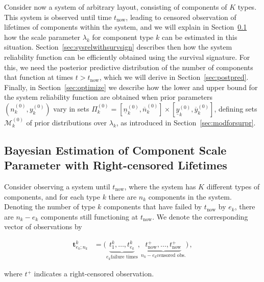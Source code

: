 \documentclass[Journal,letterpaper]{ascelike-new}
\renewcommand{\vec}[1]{{\bm#1}}
\newcommand{\uz}{^{(0)}} %
\newcommand{\ul}[1]{\underline{#1}}
\newcommand{\ol}[1]{\overline{#1}}
\def\ykz{y\uz_k}
\def\ykzl{\ul{y}\uz_k}
\def\ykzu{\ol{y}\uz_k}
\def\nkz{n\uz_k}
\def\nkzl{\ul{n}\uz_k}
\def\nkzu{\ol{n}\uz_k}
\def\MkZ{\mathcal{M}\uz_k}
\def\PkZ{\Pi\uz_k}
\def\tnow{t_\text{now}}
\def\tpnow{t^+_\text{now}}
\begin{document}
Consider now a system of arbitrary layout,
consisting of components of $K$ types.
This system is observed until time $\tnow$,
leading to censored observation of lifetimes of components within the system,
and we will explain in Section~\ref{sec:lambdawithcens}
how the scale parameter $\lambda_k$ for component type $k$
can be estimated in this situation.
%
Section~\ref{sec:sysrelwithsurvsign} describes then
how the system reliability function can be efficiently obtained using the survival signature.
%
For this, we need the posterior predictive distribution
of the number of components that function at times $t > \tnow$,
which we will derive in Section~\ref{sec:postpred}.
%
Finally, in Section~\ref{sec:optimize} we describe how
the lower and upper bound for the system reliability function
are obtained when prior parameters $(\nkz,\ykz)$
vary in sets $\PkZ = [\nkzl,\nkzu] \times [\ykzl,\ykzu]$,
defining sets $\MkZ$ of prior distributions over $\lambda_k$,
as introduced in Section~\ref{sec:modforsurpr}.


\subsection{Bayesian Estimation of Component Scale Parameter with Right-censored Lifetimes}
\label{sec:lambdawithcens}

Consider observing a system until $\tnow$,
where the system has $K$ different types of components,
and for each type $k$ there are $n_k$ components in the system.
Denoting the number of type $k$ components that have failed by $\tnow$ by $e_k$,
there are $n_k - e_k$ components still functioning at $\tnow$.
We denote the corresponding vector of observations by
\begin{linenomath*}
\begin{align}
\vec{t}^k_{e_k;n_k} &= \big( \underbrace{t^k_1, \ldots, t^k_{e_k}}_{e_k \text{failure times}},
                             \underbrace{\tpnow, \ldots, \tpnow}_{n_k-e_k \text{censored obs.}} \big)\,,
\end{align}
\end{linenomath*}
where $t^+$ indicates a right-censored observation.
\end{document}
